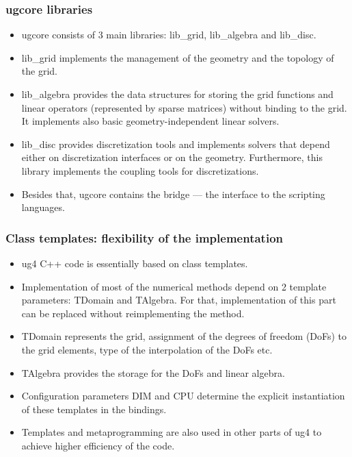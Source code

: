 \documentclass[xcolor=dvipsnames]{beamer}
\begin{document}
\begin {frame} [t]
\frametitle {ugcore libraries}
\vspace {-2ex}
\begin {itemize}
	\item ugcore consists of 3 main libraries: lib\_grid, lib\_algebra and lib\_disc.
	\pause
	\item {\color{blue} lib\_grid} implements the management of the geometry and the topology of the grid.
	\pause
	\item {\color{blue} lib\_algebra} provides the data structures for storing the grid functions and
		linear operators (represented by sparse matrices) without binding to the grid.
		It implements also basic geometry-independent linear solvers.
	\pause
	\item {\color{blue} lib\_disc} provides discretization tools and implements solvers that depend either
		on discretization interfaces or on the geometry. Furthermore, this library implements
		the coupling tools for discretizations.
	\pause
	\item Besides that, ugcore contains the {\color{blue} bridge} --- the interface to the
		scripting languages.
\end {itemize}
\end {frame}

\begin {frame} [t]
\frametitle {Class templates: flexibility of the implementation}
\begin {itemize}
	\item ug4 C++ code is essentially based on {\color{blue} class templates}.
	\pause
	\item Implementation of most of the numerical methods depend on 2 template parameters:
		{\color{blue} TDomain} and {\color{blue} TAlgebra}. For that, implementation of this part can be replaced without
		reimplementing the method.
	\pause
	\item {\color{blue} TDomain} represents the grid, assignment of the degrees of freedom (DoFs) to the
		grid elements, type of the interpolation of the DoFs etc.
	\pause
	\item {\color{blue} TAlgebra} provides the storage for the DoFs and linear algebra.
	\pause
	\item Configuration parameters DIM and CPU determine the explicit instantiation of these templates in the bindings.
	\pause
	\item Templates and metaprogramming are also used in other parts of ug4 to achieve
		higher efficiency of the code.
\end {itemize}
\end {frame}
\end{document}
